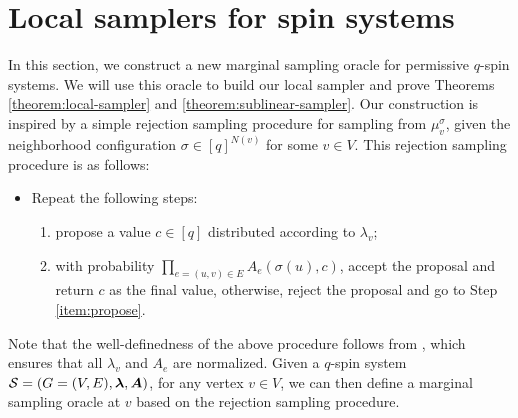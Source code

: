 
\section{Local samplers for spin systems}\label{sec:local}

In this section, we construct a new marginal sampling oracle for permissive $q$-spin systems. We will use this oracle to build our local sampler and prove Theorems \ref{theorem:local-sampler} and \ref{theorem:sublinear-sampler}. Our construction is inspired by a simple rejection sampling procedure for sampling from $\mu^{\sigma}_v$, given the neighborhood configuration $\sigma \in [q]^{N(v)}$ for some $v \in V$. 
This rejection sampling procedure is as follows:
\begin{itemize}
    \item Repeat the following steps:\label{item:reject-sampling}
    \begin{enumerate}
        \item propose a value $c\in [q]$ distributed according to $\lambda_v$;\label{item:propose}
        \item with probability $\prod\limits_{e=(u,v)\in E}A_e(\sigma(u),c)$, accept the proposal and return $c$ as the final value, otherwise, reject the proposal and go to Step \ref{item:propose}. 
    \end{enumerate}
\end{itemize}



Note that the well-definedness of the above procedure follows from , which ensures that all $\lambda_v$ and $A_e$ are normalized. Given a $q$-spin system $\mathcal{S} = (G = (V, E), \bm{\lambda}, \bm{A})$, for any vertex $v \in V$, we can then define a marginal sampling oracle at $v$ based on the rejection sampling procedure.


